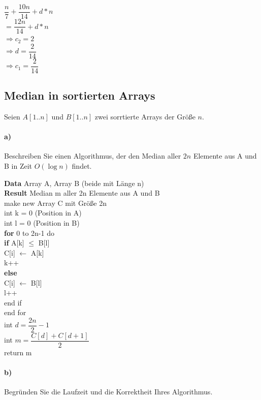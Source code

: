 \documentclass[paper=a4, fontsize=11pt]{scrartcl}
\numberwithin{equation}{section}
\numberwithin{figure}{section}
\numberwithin{table}{section}
\begin{document}
$\dfrac{n}{7} + \dfrac{10n}{14} + d*n$ \\

$= \dfrac{12n}{14} + d*n$ \\

$\Rightarrow c_{2}=2$ \\

$\Rightarrow d= \dfrac{2}{14}$ \\

$\Rightarrow c_{1} = \dfrac{2}{14}$

\subsection{Median in sortierten Arrays}
Seien $A[1..n]$ und $B[1..n]$ zwei sorrtierte Arrays der Größe $n$.

\paragraph{a)}
Beschreiben Sie einen Algorithmus, der den Median aller $2n$ Elemente aus A und B in Zeit $O(\log n)$ findet. \\

\begin{algorithm}[H]
\SetAlgoLined
\textbf{Data} Array A, Array B (beide mit Länge n) \\
\textbf{Result} Median m aller 2n Elemente aus A und B \\
make new Array C mit Größe 2n \\
int k = 0 (Position in A) \\
int l = 0 (Position in B) \\
\textbf{for} 0 to 2n-1 do \\
\textbf{if} A[k] $\leq$ B[l] \\
C[i] $\leftarrow$ A[k] \\
k++ \\
\textbf{else} \\
C[i] $\leftarrow$ B[l] \\
l++ \\
end if \\
end for \\
int $d= \dfrac{2n}{2} -1$ \\
int $m = \dfrac{C[d]+C[d+1]}{2} $ \\
return m
\end{algorithm}

\paragraph{b)}
Begründen Sie die Laufzeit und die Korrektheit Ihres Algorithmus. \\
\end{document}
